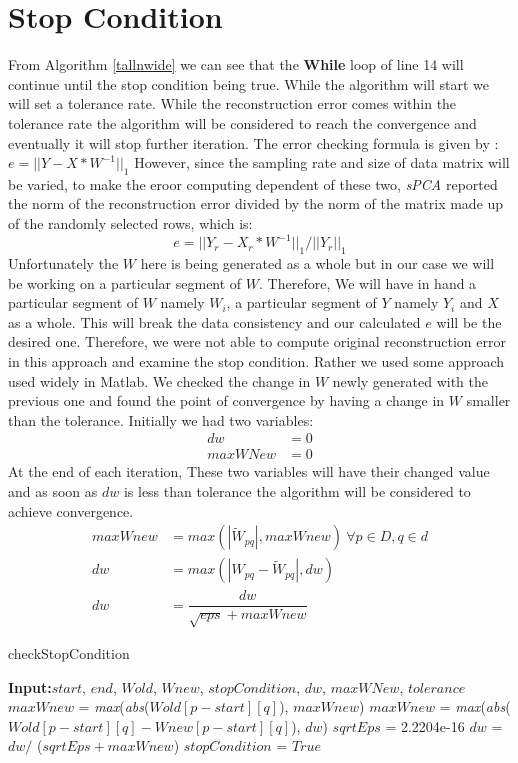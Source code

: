 \documentclass[12pt,notitlepage,oneside]{report}
\begin{document}
\section{Stop Condition}
From Algorithm \ref{tallnwide} we can see that the \textbf{While} loop of line 14 will continue until the stop condition being true. While the algorithm will start we will set a tolerance rate. While the reconstruction error comes within the tolerance rate the algorithm will be considered to reach the convergence and eventually it will stop further iteration. The error checking formula is given by \cite{bishop}:
$e = ||Y -X * W^{-1}||_1$
However, since the sampling rate and size of data matrix will be varied, to make the eroor computing dependent of these  two, \textit{sPCA} \cite{elgamal} reported the norm of the reconstruction error divided by the norm of the matrix made up of the randomly selected rows, which is:
$$e=||Y_r - X_r*W^{-1}||_1/||Y_r||_1$$
Unfortunately the $W$ here is being generated as a whole but in our case we will be working on a particular segment of $W$. Therefore, We will have in hand a particular segment of $W$ namely $W_i$, a particular segment of $Y$ namely $Y_i$ and $X$ as a whole. This will break the data consistency and our calculated $e$ will be the desired one. Therefore, we were not able to compute original reconstruction error in this approach and examine the stop condition. Rather we used some approach used widely in Matlab. We checked the change in $W$ newly generated with the previous one and found the point of convergence by having a change in $W$ smaller than the tolerance. Initially we had two variables:
\begin{align*}
dw &= 0\\
maxWNew &= 0
\end{align*}
At the end of each iteration, These two variables will have their changed value and as soon as $dw$ is less than tolerance the algorithm will be considered to achieve convergence. 
\begin{align*}
maxWnew &= max(|{\widetilde{W}}_{pq}|, maxWnew)\ \forall p \in D, q \in d\\
dw &= max(|{W}_{pq} - {\widetilde{W}}_{pq} |, dw)\\
dw &= \dfrac{dw}{\sqrt{eps} + maxWnew}
\end{align*}

\begin{algorithm}
	\begin{algorithmic}[1]
	\label{stop}
	\caption{checkStopCondition}
	\STATE \textbf{Input:}$start$, $end$, $Wold$, $Wnew$, $stopCondition$, $dw$,  $maxWNew$, $tolerance$
		\STATE $maxWnew$ = \textit{max}(\textit{abs}($Wold[p-start][q]$), $maxWnew$)
		\ENDFOR
	\ENDFOR
		\STATE $maxWnew$ = \textit{max}(\textit{abs}($Wold[p-start][q] - Wnew[p-start][q]$), $dw$)
		\ENDFOR
	\ENDFOR
	\STATE $sqrtEps$ = 2.2204e-16
	\STATE $dw$ = $dw /$ ($sqrtEps + maxWnew$)
		\STATE $stopCondition$ = $True$
	\ENDIF
	\end{algorithmic}
\end{algorithm}
\end{document}
